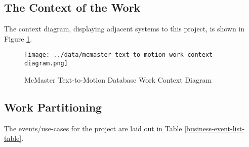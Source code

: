 \documentclass{scrreprt}
\begin{document}
\subsection{The Context of the Work}

The context diagram, displaying adjacent systems to this project, is shown in
Figure \ref{work-context-diagram}.

\begin{figure}[!ht]
        \caption{McMaster Text-to-Motion Database Work Context Diagram}
        \label{work-context-diagram}
        \centering
        \texttt{[image: ../data/mcmaster-text-to-motion-work-context-diagram.png]}
\end{figure}

\subsection{Work Partitioning}
\label{work-partitioning}

The events/use-cases for the project are laid out in Table \ref{business-event-list-table}.
\end{document}
